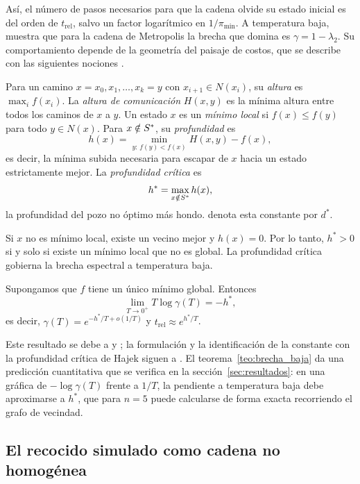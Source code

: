 Así, el número de pasos necesarios para que la cadena olvide su estado
inicial es del orden de \(t_{\mathrm{rel}}\), salvo un factor
logarítmico en \(1/\pi_{\min}\). A temperatura baja, \citet{ingrassia1994}
muestra que para la cadena de Metropolis la brecha que domina es
\(\gamma=1-\lambda_2\). Su comportamiento depende de la geometría del
paisaje de costos, que se describe con las siguientes nociones
\citep{hajek1988}.

\begin{definicion}
\label{def:profundidad}
Para un camino \(x=x_0,x_1,\ldots,x_k=y\) con \(x_{i+1}\in N(x_i)\), su
\emph{altura} es \(\max_i f(x_i)\). La \emph{altura de comunicación}
\(H(x,y)\) es la mínima altura entre todos los caminos de \(x\) a
\(y\). Un estado \(x\) es un \emph{mínimo local} si \(f(x)\le f(y)\)
para todo \(y\in N(x)\). Para \(x\notin S^{\ast}\), su \emph{profundidad} es
\[
h(x)=\min_{y:\,f(y)<f(x)}H(x,y)-f(x),
\]
es decir, la mínima subida necesaria para escapar de \(x\) hacia un
estado estrictamente mejor. La \emph{profundidad crítica} es
\[
h^\ast=\max_{x\notin S^{\ast}}h(x),
\]
la profundidad del pozo no óptimo más hondo.
\citet{hajek1988} denota esta constante por \(d^\ast\).
\end{definicion}

Si \(x\) no es mínimo local, existe un vecino mejor y \(h(x)=0\). Por
lo tanto, \(h^\ast>0\) si y solo si existe un mínimo local que no es
global. La profundidad crítica gobierna la brecha espectral a
temperatura baja.

\begin{teorema}
\label{teo:brecha_baja}
Supongamos que \(f\) tiene un único mínimo global. Entonces
\[
\lim_{T\to 0^+}T\log\gamma(T)=-h^\ast,
\]
es decir, \(\gamma(T)=e^{-h^\ast/T+o(1/T)}\) y
\(t_{\mathrm{rel}}\approx e^{h^\ast/T}\).
\end{teorema}

Este resultado se debe a \citet{holley1988} y \citet{holley1989}; la
formulación y la identificación de la constante con la profundidad
crítica de Hajek siguen a \citet{bertsimas1993}. El
teorema~\ref{teo:brecha_baja} da una predicción cuantitativa que se
verifica en la sección~\ref{sec:resultados}: en una gráfica de
\(-\log\gamma(T)\) frente a \(1/T\), la pendiente a temperatura baja
debe aproximarse a \(h^\ast\), que para \(n=5\) puede calcularse de
forma exacta recorriendo el grafo de vecindad.

\subsection{El recocido simulado como cadena no homogénea}
\label{subsec:recocido}

